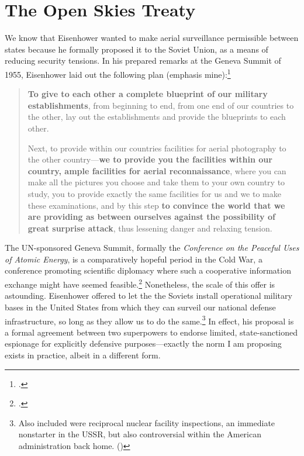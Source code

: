 \documentclass[12pt]{article}
\begin{document}

\section{The Open Skies Treaty}
We know that Eisenhower wanted to make aerial surveillance permissible between states because he formally proposed it to the Soviet Union, as a means of reducing security tensions. In his prepared remarks at the Geneva Summit of 1955, Eisenhower laid out the following plan (emphasis mine):\footcite{eisenhower_president_1955}

\begin{quote}
\textbf{To give to each other a complete blueprint of our military establishments}, from beginning to end, from one end of our countries to the other, lay out the establishments and provide the blueprints to each other.
\newline

Next, to provide within our countries facilities for aerial photography to the other country---\textbf{we to provide you the facilities within our country, ample facilities for aerial reconnaissance}, where you can make all the pictures you choose and take them to your own country to study, you to provide exactly the same facilities for us and we to make these examinations, and by this step \textbf{to convince the world that we are providing as between ourselves against the possibility of great surprise attack}, thus lessening danger and relaxing tension.
\end{quote}

The UN-sponsored Geneva Summit, formally the \emph{Conference on the Peaceful Uses of Atomic Energy}, is a comparatively hopeful period in the Cold War, a conference promoting scientific diplomacy where such a cooperative information exchange might have seemed feasible.\footcite[p.~27]{luscher_nuclear_2018} Nonetheless, the scale of this offer is astounding. Eisenhower offered to let the the Soviets install operational military bases in the United States from which they can surveil our national defense infrastructure, so long as they allow us to do the same.\footnote{Also included were reciprocal nuclear facility inspections, an immediate nonstarter in the USSR, but also controversial within the American administration back home. (\cite{prados_review_2015})} In effect, his proposal is a formal agreement between two superpowers to endorse limited, state-sanctioned espionage for explicitly defensive purposes---exactly the norm I am proposing exists in practice, albeit in a different form.
\end{document}
